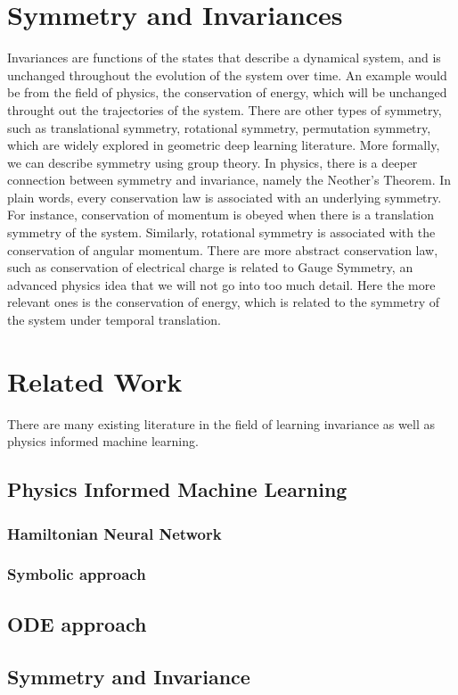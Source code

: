 \documentclass{statsmsc}
\begin{document}
\section{Symmetry and Invariances}
Invariances are functions of the states that describe a dynamical system, and is unchanged throughout the evolution of the system over time. 
An example would be from the field of physics, the conservation of energy, which will be unchanged throught out the trajectories of the system.
There are other types of symmetry, such as translational symmetry, rotational symmetry, permutation symmetry, which are widely explored in geometric deep learning literature. 
More formally, we can describe symmetry using group theory.
In physics, there is a deeper connection between symmetry and invariance, namely the Neother's Theorem.
In plain words, every conservation law is associated with an underlying symmetry.
For instance, conservation of momentum is obeyed when there is a translation symmetry of the system. 
Similarly, rotational symmetry is associated with the conservation of angular momentum.
There are more abstract conservation law, such as conservation of electrical charge is related to Gauge Symmetry, an advanced physics idea that we will not go into too much detail. 
Here the more relevant ones is the conservation of energy, which is related to the symmetry of the system under temporal translation.


\section{Related Work}
There are many existing literature in the field of learning invariance as well as physics informed machine learning.
\subsection{Physics Informed Machine Learning}
\subsubsection{Hamiltonian Neural Network}
\subsubsection{Symbolic approach}
\subsection{ODE approach}
\subsection{Symmetry and Invariance}
\end{document}

